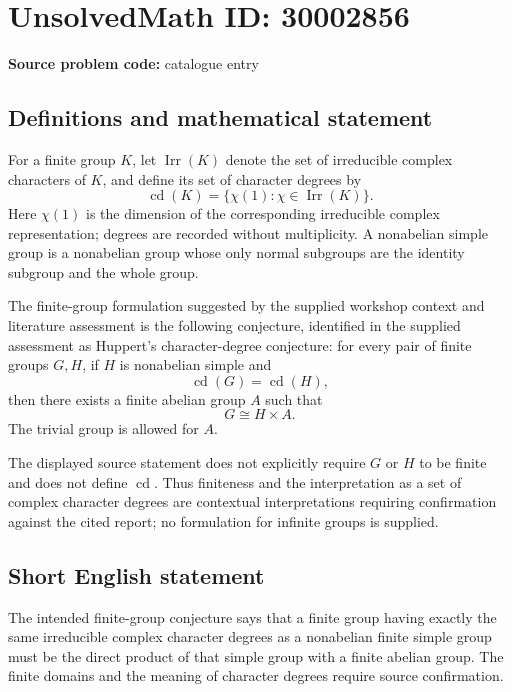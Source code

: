 \documentclass[11pt]{article}
\begin{document}
\section*{UnsolvedMath ID: 30002856}
\textbf{Source problem code:} catalogue entry
\subsection{Definitions and mathematical statement}
For a finite group \(K\), let \(\operatorname{Irr}(K)\) denote the set of irreducible complex characters of \(K\), and define its set of character degrees by
\[
\operatorname{cd}(K)=\{\chi(1):\chi\in\operatorname{Irr}(K)\}.
\]
Here \(\chi(1)\) is the dimension of the corresponding irreducible complex representation; degrees are recorded without multiplicity. A nonabelian simple group is a nonabelian group whose only normal subgroups are the identity subgroup and the whole group.

The finite-group formulation suggested by the supplied workshop context and literature assessment is the following conjecture, identified in the supplied assessment as Huppert's character-degree conjecture: for every pair of finite groups \(G,H\), if \(H\) is nonabelian simple and
\[
\operatorname{cd}(G)=\operatorname{cd}(H),
\]
then there exists a finite abelian group \(A\) such that
\[
G\cong H\times A.
\]
The trivial group is allowed for \(A\).

The displayed source statement does not explicitly require \(G\) or \(H\) to be finite and does not define \(\operatorname{cd}\). Thus finiteness and the interpretation as a set of complex character degrees are contextual interpretations requiring confirmation against the cited report; no formulation for infinite groups is supplied.
\subsection{Short English statement}
The intended finite-group conjecture says that a finite group having exactly the same irreducible complex character degrees as a nonabelian finite simple group must be the direct product of that simple group with a finite abelian group. The finite domains and the meaning of character degrees require source confirmation.
\end{document}
